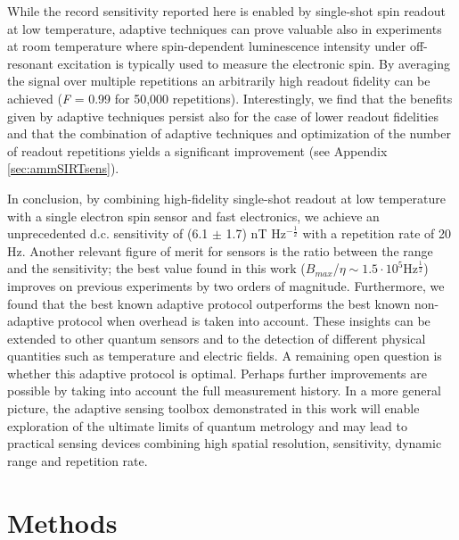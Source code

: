 While the record sensitivity reported here is enabled by single-shot spin readout at low temperature, adaptive techniques can prove valuable also in experiments at room temperature\cite{Nusran_NatNano_2012} where spin-dependent luminescence intensity under off-resonant excitation is typically used to measure the electronic spin. By averaging the signal over multiple repetitions an arbitrarily high readout fidelity can be achieved (\textit{F} = 0.99 for 50,000 repetitions\cite{Nusran_NatNano_2012}). Interestingly, we find that the benefits given by adaptive techniques persist also for the case of lower readout fidelities and that the combination of adaptive techniques and optimization of the number of readout repetitions yields a significant improvement (see Appendix \ref{sec:ammSIRTsens}).

In conclusion, by combining high-fidelity single-shot readout at low temperature with a single electron spin sensor and fast electronics, we achieve an unprecedented d.c. sensitivity of (6.1 $\pm$ 1.7) nT Hz$^{-\frac{1}{2}}$ with a repetition rate of 20 Hz. Another relevant figure of merit for sensors is the ratio between the range and the sensitivity; the best value found in this work ($B_{max}$/$\eta \sim 1.5 \cdot 10^5 $Hz$^{\frac{1}{2}}$) improves on previous experiments by two orders of magnitude\cite{Waldherr_NatNano_2012,Nusran_NatNano_2012}. Furthermore, we found that the best known adaptive protocol outperforms the best known non-adaptive protocol when overhead is taken into account. These insights can be extended to other quantum sensors and to the detection of different physical quantities such as temperature and electric fields. A remaining open question is whether this adaptive protocol is optimal. Perhaps further improvements are possible by taking into account the full measurement history. In a more general picture, the adaptive sensing toolbox demonstrated in this work will enable exploration of the ultimate limits of quantum metrology and may lead to practical sensing devices combining high spatial resolution, sensitivity, dynamic range and repetition rate.



\section{Methods}
